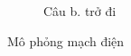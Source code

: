 \begin{figure}[!htbp]
\begin{subfigure}{.5\textwidth}
        \caption{Câu b. trở đi}
    \end{subfigure}
    \caption{Mô phỏng mạch điện}
\end{figure}